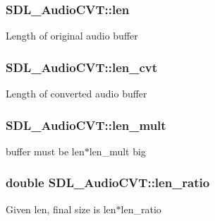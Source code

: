 \subsubsection[{\texorpdfstring{len}{len}}]{ S\+D\+L\+\_\+\+Audio\+C\+V\+T\+::len}\hypertarget{struct_s_d_l___audio_c_v_t_aeaeb8c5a63c3ab96471fbfdf412c78ff}{}\label{struct_s_d_l___audio_c_v_t_aeaeb8c5a63c3ab96471fbfdf412c78ff}
Length of original audio buffer 
\subsubsection[{\texorpdfstring{len\+\_\+cvt}{len_cvt}}]{ S\+D\+L\+\_\+\+Audio\+C\+V\+T\+::len\+\_\+cvt}\hypertarget{struct_s_d_l___audio_c_v_t_a5c60163f34d1947e5b166c23aba9879d}{}\label{struct_s_d_l___audio_c_v_t_a5c60163f34d1947e5b166c23aba9879d}
Length of converted audio buffer 
\subsubsection[{\texorpdfstring{len\+\_\+mult}{len_mult}}]{ S\+D\+L\+\_\+\+Audio\+C\+V\+T\+::len\+\_\+mult}\hypertarget{struct_s_d_l___audio_c_v_t_ac9662d47cf2348b82b27b151150116b0}{}\label{struct_s_d_l___audio_c_v_t_ac9662d47cf2348b82b27b151150116b0}
buffer must be len$\ast$len\+\_\+mult big 
\subsubsection[{\texorpdfstring{len\+\_\+ratio}{len_ratio}}]{\setlength{\rightskip}{0pt plus 5cm}double S\+D\+L\+\_\+\+Audio\+C\+V\+T\+::len\+\_\+ratio}\hypertarget{struct_s_d_l___audio_c_v_t_a5628ff5ccf711de9d77c0a4a9f57d2f0}{}\label{struct_s_d_l___audio_c_v_t_a5628ff5ccf711de9d77c0a4a9f57d2f0}
Given len, final size is len$\ast$len\+\_\+ratio 
